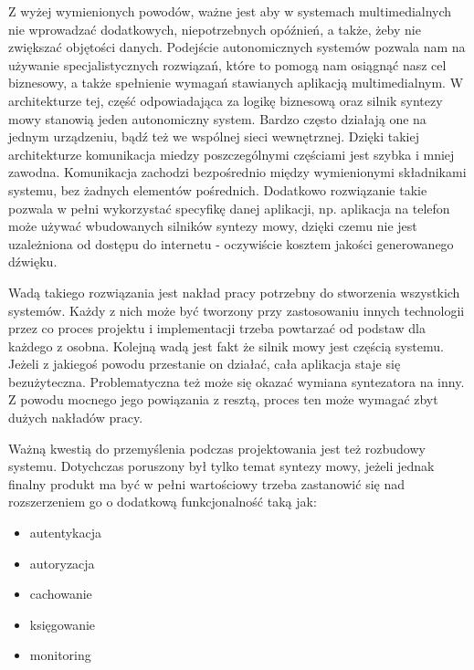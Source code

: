 Z wyżej wymienionych powodów, ważne jest aby w systemach multimedialnych nie wprowadzać dodatkowych, niepotrzebnych opóźnień, a także, żeby nie zwiększać objętości danych. Podejście autonomicznych systemów pozwala nam na używanie specjalistycznych rozwiązań, które to pomogą nam osiągnąć nasz cel biznesowy, a także spełnienie wymagań stawianych aplikacją multimedialnym. W architekturze tej, część odpowiadająca za logikę biznesową oraz silnik syntezy mowy stanowią jeden autonomiczny system. Bardzo często działają one na jednym urządzeniu, bądź też we wspólnej sieci wewnętrznej. Dzięki takiej architekturze komunikacja miedzy poszczególnymi częściami jest szybka i mniej zawodna. Komunikacja zachodzi bezpośrednio między wymienionymi składnikami systemu, bez żadnych elementów pośrednich. Dodatkowo rozwiązanie takie pozwala w pełni wykorzystać specyfikę danej aplikacji, np. aplikacja na telefon może używać wbudowanych silników syntezy mowy, dzięki czemu nie jest uzależniona od dostępu do internetu - oczywiście  kosztem jakości generowanego dźwięku. 

Wadą takiego rozwiązania jest nakład pracy potrzebny do stworzenia wszystkich systemów. Każdy z nich może być tworzony przy zastosowaniu innych technologii przez co proces projektu i implementacji trzeba powtarzać od podstaw dla każdego z osobna. 
 Kolejną wadą jest fakt że silnik mowy jest częścią systemu. Jeżeli z jakiegoś powodu przestanie on działać, cała aplikacja staje się bezużyteczna. Problematyczna też może się okazać wymiana syntezatora na inny. Z powodu mocnego jego powiązania z resztą, proces ten może wymagać zbyt dużych nakładów pracy.

Ważną kwestią do przemyślenia podczas projektowania jest też rozbudowy systemu. Dotychczas poruszony był tylko temat syntezy mowy, jeżeli  jednak finalny produkt ma być w pełni wartościowy trzeba zastanowić się nad rozszerzeniem go o dodatkową funkcjonalność taką jak:

\label{list:uslugi}
\begin{itemize}
	\item autentykacja
	\item autoryzacja
	\item cachowanie
	\item księgowanie
	\item monitoring
\end{itemize}


